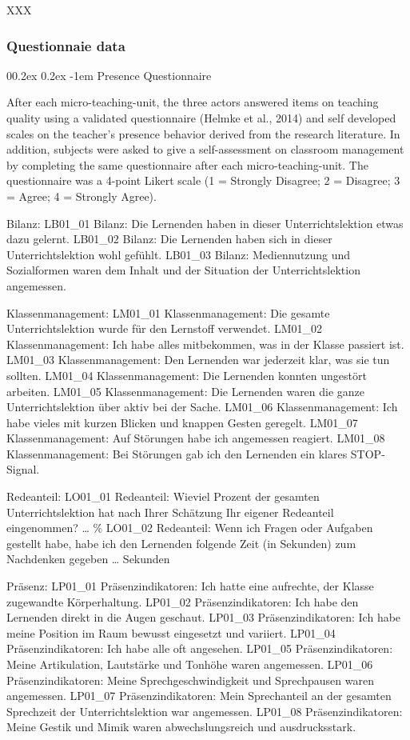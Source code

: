 \documentclass[
  man]{apa6}
\makeatletter
\let\oldparagraph\paragraph
\renewcommand{\paragraph}[1]{\oldparagraph{#1}\mbox{}}
\renewcommand{\paragraph}{\@startsection{paragraph}{4}{\parindent}%
  {0\baselineskip \@plus 0.2ex \@minus 0.2ex}%
  {-1em}%
  {\normalfont\normalsize\bfseries\itshape\typesectitle}}
\makeatother
\begin{document}
XXX

\subsubsection{Questionnaie data}\label{questionnaie-data}

\paragraph{Presence Questionnaire}\label{presence-questionnaire}

After each micro-teaching-unit, the three actors answered items on teaching quality using a validated questionnaire (Helmke et al., 2014) and self developed scales on the teacher's presence behavior derived from the research literature. In addition, subjects were asked to give a self-assessment on classroom management by completing the same questionnaire after each micro-teaching-unit. The questionnaire was a 4-point Likert scale (1 = Strongly Disagree; 2 = Disagree; 3 = Agree; 4 = Strongly Agree).

Bilanz:
LB01\_01 Bilanz: Die Lernenden haben in dieser Unterrichtslektion etwas dazu gelernt.
LB01\_02 Bilanz: Die Lernenden haben sich in dieser Unterrichtslektion wohl gefühlt.
LB01\_03 Bilanz: Mediennutzung und Sozialformen waren dem Inhalt und der Situation der Unterrichtslektion angemessen.

Klassenmanagement:
LM01\_01 Klassenmanagement: Die gesamte Unterrichtslektion wurde für den Lernstoff verwendet.
LM01\_02 Klassenmanagement: Ich habe alles mitbekommen, was in der Klasse passiert ist.
LM01\_03 Klassenmanagement: Den Lernenden war jederzeit klar, was sie tun sollten.
LM01\_04 Klassenmanagement: Die Lernenden konnten ungestört arbeiten.
LM01\_05 Klassenmanagement: Die Lernenden waren die ganze Unterrichtslektion über aktiv bei der Sache.
LM01\_06 Klassenmanagement: Ich habe vieles mit kurzen Blicken und knappen Gesten geregelt.
LM01\_07 Klassenmanagement: Auf Störungen habe ich angemessen reagiert.
LM01\_08 Klassenmanagement: Bei Störungen gab ich den Lernenden ein klares STOP-Signal.

Redeanteil:
LO01\_01 Redeanteil: Wieviel Prozent der gesamten Unterrichtslektion hat nach Ihrer Schätzung Ihr eigener Redeanteil eingenommen? \ldots{} \%
LO01\_02 Redeanteil: Wenn ich Fragen oder Aufgaben gestellt habe, habe ich den Lernenden folgende Zeit (in Sekunden) zum Nachdenken gegeben \ldots{} Sekunden

Präsenz:
LP01\_01 Präsenzindikatoren: Ich hatte eine aufrechte, der Klasse zugewandte Körperhaltung.
LP01\_02 Präsenzindikatoren: Ich habe den Lernenden direkt in die Augen geschaut.
LP01\_03 Präsenzindikatoren: Ich habe meine Position im Raum bewusst eingesetzt und variiert.
LP01\_04 Präsenzindikatoren: Ich habe alle oft angesehen.
LP01\_05 Präsenzindikatoren: Meine Artikulation, Lautstärke und Tonhöhe waren angemessen.
LP01\_06 Präsenzindikatoren: Meine Sprechgeschwindigkeit und Sprechpausen waren angemessen.
LP01\_07 Präsenzindikatoren: Mein Sprechanteil an der gesamten Sprechzeit der Unterrichtslektion war angemessen.
LP01\_08 Präsenzindikatoren: Meine Gestik und Mimik waren abwechslungsreich und ausdrucksstark.
\end{document}
